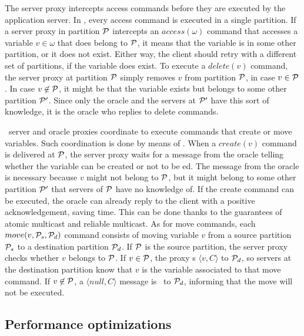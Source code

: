 

The server proxy intercepts access commands before they are executed by the application server.
In \dssmr{}, every access command is executed in a single partition.
If a server proxy in partition $\mathcal{P}$ intercepts an $access(\omega)$ command that accesses a variable $v \in \omega$ that does belong to $\mathcal{P}$, it means that the variable is in some other partition, or it does not exist.
Either way, the client should retry with a different set of partitions, if the variable does exist.
To execute a $delete(v)$ command, the server proxy at partition $\mathcal{P}$ simply removes $v$ from partition $\mathcal{P}$, in case $v \in \mathcal{P}$.
In case $v \not\in \mathcal{P}$, it might be that the variable exists but belongs to some other partition $\mathcal{P}'$.
Since only the oracle and the servers at $\mathcal{P}'$ have this sort of knowledge, it is the oracle who replies to delete commands.

\dssmr\ server and oracle proxies coordinate to execute commands that create or move variables.
Such coordination is done by means of \rmcast{}.
When a $create(v)$ command is delivered at $\mathcal{P}$, the server proxy waits for a message from the oracle telling whether the variable can be created or not to be \rmdel{}ed.
The message from the oracle is necessary because $v$ might not belong to $\mathcal{P}$, but it might belong to some other partition $\mathcal{P}'$ that servers of $\mathcal{P}$ have no knowledge of.
If the create command can be executed, the oracle can already reply to the client with a positive acknowledgement, saving time.
This can be done thanks to the guarantees of atomic multicast and reliable multicast.
As for move commands, each $move(v,\mathcal{P}_s,\mathcal{P}_d)$ command consists of moving variable $v$ from a source partition $\mathcal{P}_s$ to a destination partition $\mathcal{P}_d$.
If $\mathcal{P}$ is the source partition, the server proxy checks whether $v$ belongs to $\mathcal{P}$.
If $v \in \mathcal{P}$, the proxy \rmcast{}s $\langle v, C \rangle$ to $\mathcal{P}_d$, so servers at the destination partition know that $v$ is the variable associated to that move command.
If $v \not\in \mathcal{P}$, a $\langle null, C \rangle$ message is \rmcast\ to $\mathcal{P}_d$, informing that the move will not be executed.







%

\subsection{Performance optimizations}
\label{sec:optm}

